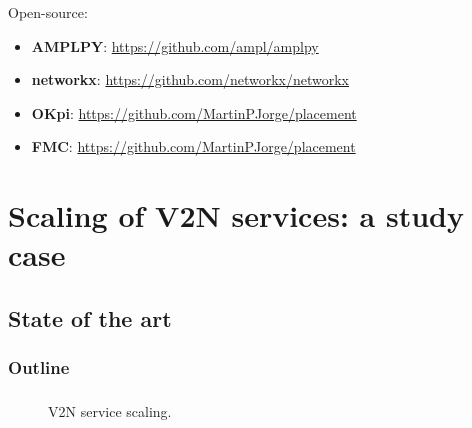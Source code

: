 \documentclass[aspectratio=169]{beamer}
\begin{document}
\begin{frame}
    \frametitle{\secname}
    \framesubtitle{\subsecname}
    Open-source:
    \begin{itemize}
        \item \textbf{AMPLPY}: \url{https://github.com/ampl/amplpy}
        \item \textbf{networkx}: \url{https://github.com/networkx/networkx}
        \item \textbf{OKpi}: \url{https://github.com/MartinPJorge/placement}
        \item \textbf{FMC}: \url{https://github.com/MartinPJorge/placement}
    \end{itemize}
\end{frame}







\section{Scaling of V2N services: a study case}
\subsection{State of the art}
\begin{frame}
    \frametitle{Outline}
    \tableofcontents[subsectionstyle=show/shaded/hide,sectionstyle=show/shaded]
\end{frame}



\begin{frame}
    \frametitle{\secname}
    \framesubtitle{\subsecname}

    \begin{figure}
        \caption{V2N service scaling.}
    \end{figure}

\end{frame}
\end{document}
